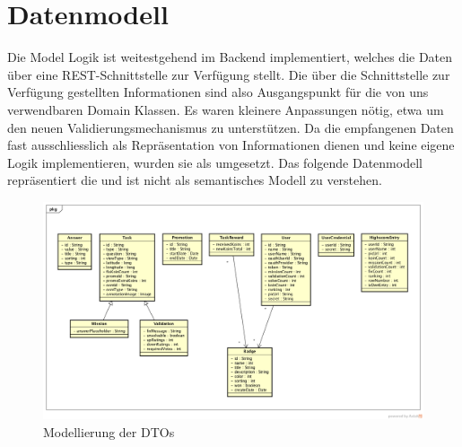 \label{pd-datenmodell}
\section{Datenmodell}
Die Model Logik ist weitestgehend im \gls{Backend} implementiert, welches die Daten über eine \gls{REST}-Schnittstelle zur Verfügung stellt.
Die über die Schnittstelle zur Verfügung gestellten Informationen sind also Ausgangspunkt für die von uns verwendbaren Domain Klassen.
Es waren kleinere Anpassungen nötig, etwa um den neuen Validierungsmechanismus zu unterstützen.
Da die empfangenen Daten fast ausschliesslich als Repräsentation von Informationen dienen und keine eigene Logik implementieren, wurden sie als  umgesetzt.\newline
Das folgende Datenmodell repräsentiert die  und ist nicht als semantisches Modell zu verstehen.\newline
\begin{figure}[H]
 	\centering
 	\includegraphics[width=\textwidth]{images/projektdokumentation/Datenmodell.png}
 	\caption{Modellierung der DTOs}
 	\label{image-data-model}
\end{figure}
